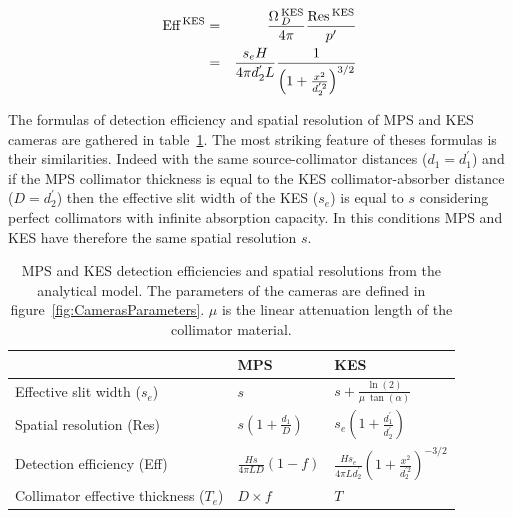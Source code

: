 \documentclass[a4paper,english]{article}
\begin{document}
\begin{eqnarray}
  \label{eq:de_kes}
	\textrm{Eff}\,_{}^{\textrm{KES}} & = & \frac{\Omega\,_D^{\textrm{KES}}}{4\pi} \frac{\textrm{Res}\,_{}^{\textrm{KES}}}{p'} \nonumber\\
	& = & \frac{s_e H}{4\pi d_2^{'} L} \frac{1}{\left( 1+\frac{x^2}{d_2^{'2}}\right)^{3/2}}
\end{eqnarray}



The formulas of detection efficiency and spatial resolution of MPS and KES cameras are gathered in table~\ref{table:AMformulas}. The most striking feature of theses formulas is their similarities. Indeed with the same source-collimator distances ($d_1=d_1^{'}$) and if the MPS collimator thickness is equal to the KES collimator-absorber distance ($D=d_2^{'}$) then the effective slit width of the KES ($s_e$) is equal to $s$ considering perfect collimators with infinite absorption capacity. In this conditions MPS and KES have therefore the same spatial resolution $s$.

\begin{table}[h]
\centering
\begin{tabular}{lll}
	\midrule
	                            & MPS                              & KES \\
	\midrule
	Effective slit width ($s_e$)& $s$                              & $s + \frac{\ln(2)}{\mu~\tan(\alpha)}$ \\
 	Spatial resolution (Res)		& $s \left(1+\frac{d_1}{D}\right)$ & $s_e \left( 1+\frac{d_1^{'}}{d_2^{'}} \right)$ \\
	Detection efficiency (Eff)	& $\frac{H s}{ 4 \pi L D } (1-f) $ & $\frac{H s_e}{ 4 \pi L d_2^{'} } \left( 1 + \frac{x^2}{d_2^{'2}} \right)^{-3/2} $ \\
 	Collimator effective thickness ($T_e$) & $D\times f$           & $T$ \\
	\midrule
\end{tabular}
\caption{MPS and KES detection efficiencies and spatial resolutions from the analytical model. The parameters of the cameras are defined in figure~\ref{fig:CamerasParameters}. $\mu$ is the linear attenuation length of the collimator material.}
\label{table:AMformulas}
\end{table}
\end{document}
